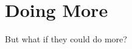 \documentclass[../../main]{subfiles}
\begin{document}
\section{Doing More} \label{sec:}

But what if they could do more?
\end{document}

